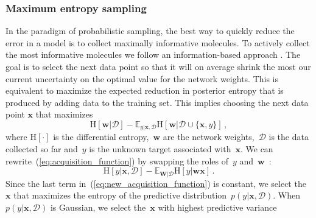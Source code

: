 \subsubsection{Maximum entropy sampling}

In the paradigm of probabilistic sampling, the best way to quickly reduce the error in a model is to collect maximally informative molecules. To actively collect the most informative molecules we follow an information-based approach \cite{MacKay_1992}. The goal
is to select the next data point so that it will on average shrink the most our current uncertainty on the optimal value for the network weights. This is equivalent to maximize the expected reduction in posterior entropy that is produced by adding data to the training set. This implies choosing the next data point $\mathbf{x}$ that maximizes
\begin{equation}
\text{H}[\mathbf{w}|\mathcal{D}] - 
\mathbb{E}_{y|\mathbf{x},\mathcal{D}}\text{H}[\mathbf{w}|\mathcal{D}\cup\{\mathbf{x},y\}]\,,\label{eq:acquisition_function}
\end{equation}
where $\text{H}[\cdot]$ is the differential entropy,~$\mathbf{w}$ are the network weights,~$\mathcal{D}$ is the data collected so far and~$y$ is the unknown target associated with~$\mathbf{x}$. We can rewrite~(\ref{eq:acquisition_function}) by swapping the roles of~$y$ and~$\mathbf{w}$~\cite{houlsby2012collaborative}:
\begin{equation}
\text{H}[y | \mathbf{x},\mathcal{D}] - 
\mathbb{E}_{\mathbf{W} | \mathcal{D}}\text{H}[y | \mathbf{w}\mathbf{x}]\,.\label{eq:new_acquisition_function}
\end{equation}
Since the last term in~(\ref{eq:new_acquisition_function}) is constant, we select the~$\mathbf{x}$ that maximizes the entropy of the predictive distribution~$p(y| \mathbf{x},\mathcal{D})$. When $p(y| \mathbf{x},\mathcal{D})$ is Gaussian, we select the~$\mathbf{x}$ with highest predictive variance